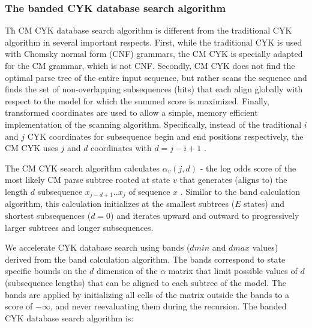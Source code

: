 \documentclass[11pt]{article}
\begin{document}
\subsubsection{The banded CYK database search algorithm}
Th CM CYK database search algorithm is different from the traditional
CYK algorithm \cite{Kasami65, Younger67, HopcroftUllman79} in several
important respects. First, while the traditional CYK is used with
Chomsky normal form (CNF) grammars, the CM CYK is specially adapted
for the CM grammar, which is not CNF\@. Secondly, CM CYK does not find
the optimal parse tree of the entire input sequence, but
rather scans the sequence and finds the set of
non-overlapping subsequences (hits) that each align globally with
respect to the model for which the summed score is maximized. Finally, 
transformed coordinates are used to allow a simple, memory efficient
implementation of the scanning algorithm. Specifically, instead of the
traditional $i$ and $j$ CYK coordinates for subsequence begin and end
positions respectively, the CM CYK uses $j$ and $d$ coordinates with
$d = j-i+1$ \cite{Durbin98}.

The CM CYK search algorithm calculates $\alpha_v(j,d)$ - the log odds score
of the most likely CM parse subtree rooted at state $v$ that generates
(aligns to) the length $d$ subsequence $x_{j-d+1}..x_j$ of sequence
$x$ \cite{Durbin98}. 
Similar to the band calculation algorithm, this calculation initializes
at the smallest subtrees ($E$ states) and shortest subsequences
($d=0$) and iterates upward and outward to progressively larger
subtrees and longer subsequences. 

We accelerate CYK database search using bands ($dmin$ and $dmax$
values) derived from the band calculation algorithm. The bands
correspond to state specific bounds on the $d$ dimension of the
$\alpha$ matrix that limit possible values of $d$ (subsequence
lengths) that can be aligned to each subtree of the model. The bands
are applied by initializing all cells of the matrix outside the bands
to a score of $-\infty$, and never
reevaluating them during the recursion. The banded CYK database search
algorithm is: 
\end{document}
